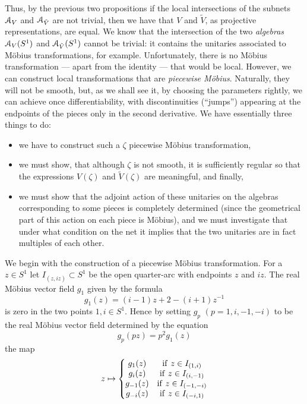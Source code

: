 \documentclass[12pt]{article}
\begin{document}
Thus, by the previous two propositions if the local intersections
of the subnets ${\mathcal A}_V$ and ${\mathcal A}_{\tilde{V}}$ are not trivial, then we have
that $V$ and $\tilde{V}$, as projective representations, are equal.
We know that the intersection of the two {\it algebras} ${\mathcal A}_V(S^1)$ and
${\mathcal A}_{\tilde{V}}(S^1)$ cannot be trivial: it contains the unitaries
associated to M\"obius transformations, for example. 
Unfortunately, there is no M\"obius transformation --- apart from the
identity --- that would be local. However, we can construct local
transformations that are {\it piecewise M\"obius}. 
Naturally, they will not be smooth, but, as we shall see it, 
by choosing the parameters rightly, we can achieve 
once differentiability, with discontinuities (``jumps'') appearing 
at the endpoints of the pieces only in the second derivative.
We have essentially three things to do:
\begin{itemize}    
\item[(i)]
we have to construct such a $\zeta$ piecewise M\"obius transformation,

\item[(i)] 
we must show, that although $\zeta$ is not smooth, it is
sufficiently regular so that the expressions $V(\zeta)$ and
$\tilde{V}(\zeta)$ are meaningful, and finally,

\item[(ii)]
we must show that the adjoint action of these unitaries on the 
algebras corresponding to some pieces is completely determined 
(since the geometrical part of this action on each piece is
M\"obius), and we must investigate that under what condition
on the net it implies that the two unitaries are in fact multiples
of each other. 
\end{itemize}
We begin with the construction of a piecewise M\"obius transformation.
For a $z \in S^1$ let $I_{(z,iz)} \subset S^1$ be the open quarter-arc
with
endpoints $z$ and $iz$. The real M\"obius vector field $g_1$ given by
the formula
\begin{equation}
g_1(z)=(i-1)z+2-(i+1)z^{-1}
\end{equation}
is zero in the two points $1,i \in S^1$. Hence by setting 
$g_p \,\,(p=1,i,-1,-i)$ to be the real M\"obius vector field
determined by the equation
\begin{equation}
g_p(pz)=p^2 g_1(z)
\end{equation}
the map
\begin{equation}
z \mapsto \left\{ 
\begin{matrix}
g_1(z) & {\rm if}\,\,  z \in I_{(1,i)} \\ 
g_i(z) & {\rm if}\,\,  z \in I_{(i,-1)} \\ 
g_{-1}(z) & {\rm if}\,\, z \in I_{(-1,-i)} \\ 
g_{-i}(z) & {\rm if}\,\, z \in I_{(-i,1)} \\ 
\end{matrix} \right.
\end{equation}
\end{document}
